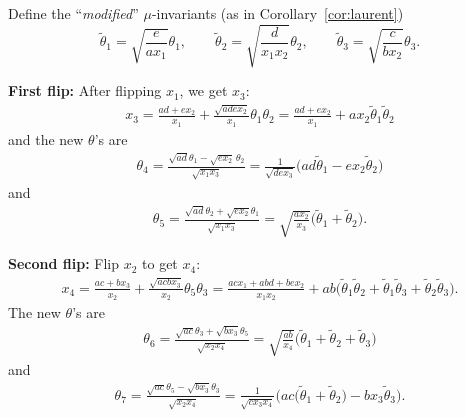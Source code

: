 \documentclass[11pt]{article}
\numberwithin{equation}{section}
\newcommand{\til}[0]{\widetilde{\theta}}
\numberwithin{equation}{section}
\begin{document}
Define the ``\emph{modified}'' $\mu$-invariants (as in Corollary~\ref{cor:laurent})
\[ \til_1 = \sqrt{\frac{e}{ax_1}} \theta_1, \qquad \til_2 = \sqrt{\frac{d}{x_1x_2}} \theta_2, \qquad \til_3 =\sqrt{\frac{c}{bx_2}} \theta_3. \]

\textbf{First flip:} After flipping $x_1$, we get $x_3$:
\begin{align*}
 x_3 = \frac{ad + ex_2}{x_1} + \frac{\sqrt{adex_2}}{x_1} \theta_1 \theta_2
 = \frac{ad+ex_2}{x_1} + ax_2 \widetilde{\theta}_1 \widetilde{\theta}_2
\end{align*}
and the new $\theta$'s are
\begin{align*}
 \theta_4 = \frac{\sqrt{ad} \theta_1 - \sqrt{ex_2} \, \theta_2}{\sqrt{x_1x_3}}
 = \frac{1}{\sqrt{dex_3}} \big( ad \widetilde{\theta}_1 - ex_2 \widetilde{\theta}_2 \big)
\end{align*}
and
\begin{align*}
 \theta_5 = \frac{\sqrt{ad} \theta_2 + \sqrt{ex_2} \theta_1}{\sqrt{x_1x_3}}
 = \sqrt{\frac{ax_2}{x_3}} \big( \widetilde{\theta}_1 + \widetilde{\theta}_2 \big).
\end{align*}

\textbf{Second flip:} Flip $x_2$ to get $x_4$:
\begin{align*}
 x_4 = \frac{ac + bx_3}{x_2} + \frac{\sqrt{acbx_3}}{x_2} \theta_5 \theta_3
 = \frac{acx_1+abd+bex_2}{x_1x_2} + ab \big( \widetilde{\theta}_1 \widetilde{\theta}_2 + \widetilde{\theta}_1 \widetilde{\theta}_3 + \widetilde{\theta}_2 \widetilde{\theta}_3 \big).
\end{align*}
The new $\theta$'s are
\begin{align*}
 \theta_6 = \frac{\sqrt{ac} \theta_3 + \sqrt{bx_3} \theta_5}{\sqrt{x_2x_4}}
 = \sqrt{\frac{ab}{x_4}} \big( \widetilde{\theta}_1 + \widetilde{\theta}_2 + \widetilde{\theta}_3 \big)
\end{align*}
and
\begin{align*}
 \theta_7 = \frac{\sqrt{ac} \theta_5 - \sqrt{bx_3} \theta_3}{\sqrt{x_2x_4}}
 = \frac{1}{\sqrt{cx_3x_4}} \big( ac\big(\widetilde{\theta}_1 + \widetilde{\theta}_2\big) - bx_3 \widetilde{\theta}_3 \big).
\end{align*}
\end{document}
